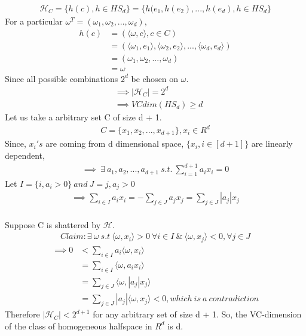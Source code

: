 \documentclass{article}
\begin{document}
\begin{enumerate}
\begin{align*}
    \mathcal{H}_C = \{h(c), h \in HS_d\} = \{h(e_1,h(e_2),...,h(e_d), h \in HS_d\}
\end{align*}
For a particular $\omega^T = (\omega_1, \omega_2, . . . , \omega_d)$,
\begin{align*}
    h(c) &= (\langle\omega, c\rangle, c \in C)\\
         &= (\langle\omega_1, e_1\rangle,\langle\omega_2, e_2\rangle, . . . ,\langle\omega_d, e_d\rangle)\\
         &= (\omega_1, \omega_2, . . . , \omega_d)\\
         &= \omega
\end{align*}
Since all possible combinations $2^d$ be chosen on $\omega$.
\begin{align*}
    &\implies |\mathcal{H}_C| = 2^d\\
    &\implies VC dim(HS_d) \geq d
\end{align*}
Let us take a arbitrary set C of size d + 1.
\begin{align*}
    C = \{x_1, x_2, . . . , x_{d + 1}\} , x_i \in R^d
\end{align*}
Since, $x_i's$ are coming from d dimensional space, $\{x_i, i \in [d + 1]\}$ are linearly dependent,
\begin{align*}
    \implies\ \exists\ a_1, a_2, ..., a_{d+1}\ s.t.\ \sum_{i=1}^{d+1}a_ix_i = 0
\end{align*}
Let $I = \{i, a_i > 0\} \ and \  J = {j, a_j > 0}$ 
\begin{align*}
    \implies \sum_{i\in I} a_ix_i = -\sum _{j\in J} a_jx_j  = \sum_{j \in J} |a_j|x_j
\end{align*}
\\Suppose C is shattered by $\mathcal{H}$. 
\begin{align*}
    Claim: \exists \ \omega \ s.t \ \langle \omega, x_i \rangle > 0 \ \forall i \in I \ \& \ \langle \omega, x_j \rangle < 0 , \forall j \in J
\end{align*}
\begin{align*}
    \implies 0 &< \sum_{i \in I} a_i \langle \omega, x_i \rangle \\
               &= \sum_{i \in I} \langle \omega, a_ix_i \rangle \\
               &= \sum_{j \in J} \langle \omega, |a_j|x_j \rangle \\
               &= \sum_{j \in J} |a_j|\langle \omega, x_j \rangle < 0, which \  is \ a \ contradiction
\end{align*}
Therefore $|\mathcal{H}_C| < 2^{d+1}$ for any arbitrary set of size d + 1. So, the VC-dimension of the class of homogeneous halfspace in $R^d$ is d.
\end{enumerate}
\end{document}

